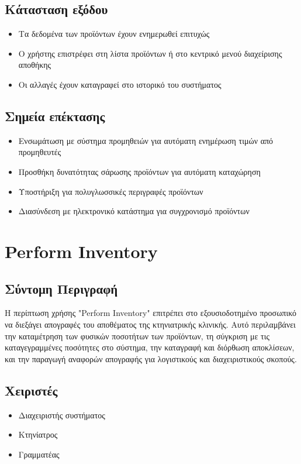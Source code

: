 \documentclass[12pt,a4paper,twoside]{book}
\begin{document}
\subsection{Κάτασταση εξόδου}
\begin{itemize}
  \item Τα δεδομένα των προϊόντων έχουν ενημερωθεί επιτυχώς
  \item Ο χρήστης επιστρέφει στη λίστα προϊόντων ή στο κεντρικό μενού διαχείρισης αποθήκης
  \item Οι αλλαγές έχουν καταγραφεί στο ιστορικό του συστήματος
\end{itemize}

\subsection{Σημεία επέκτασης}
\begin{itemize}
  \item Ενσωμάτωση με σύστημα προμηθειών για αυτόματη ενημέρωση τιμών από προμηθευτές
  \item Προσθήκη δυνατότητας σάρωσης προϊόντων για αυτόματη καταχώρηση
  \item Υποστήριξη για πολυγλωσσικές περιγραφές προϊόντων
  \item Διασύνδεση με ηλεκτρονικό κατάστημα για συγχρονισμό προϊόντων
\end{itemize}

\section{Perform Inventory}

\subsection{Σύντομη Περιγραφή}
Η περίπτωση χρήσης "Perform Inventory" επιτρέπει στο εξουσιοδοτημένο προσωπικό να διεξάγει απογραφές του αποθέματος της κτηνιατρικής κλινικής. Αυτό περιλαμβάνει την καταμέτρηση των φυσικών ποσοτήτων των προϊόντων, τη σύγκριση με τις καταγεγραμμένες ποσότητες στο σύστημα, την καταγραφή και διόρθωση αποκλίσεων, και την παραγωγή αναφορών απογραφής για λογιστικούς και διαχειριστικούς σκοπούς. %

\subsection{Χειριστές}
\begin{itemize}
  \item Διαχειριστής συστήματος
  \item Κτηνίατρος
  \item Γραμματέας
\end{itemize}
\end{document}
